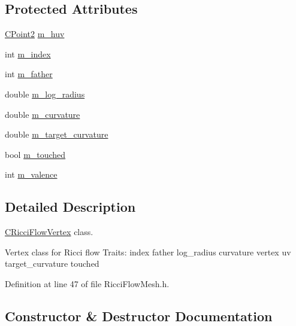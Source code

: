 \subsection*{Protected Attributes}
\begin{DoxyCompactItemize}
\item 
\hyperlink{class_mesh_lib_1_1_c_point2}{C\+Point2} \hyperlink{class_mesh_lib_1_1_c_ricci_flow_vertex_a674116f5178c06d98b5ef26deabdeec6}{m\+\_\+huv}
\item 
int \hyperlink{class_mesh_lib_1_1_c_ricci_flow_vertex_a7ab6932d891ddbb10c14f0ab984d3b36}{m\+\_\+index}
\item 
int \hyperlink{class_mesh_lib_1_1_c_ricci_flow_vertex_a6ed5050df5a2f6284a98bb37c553a57e}{m\+\_\+father}
\item 
double \hyperlink{class_mesh_lib_1_1_c_ricci_flow_vertex_ac9f92366ddb0d823a6dfc6a526db9295}{m\+\_\+log\+\_\+radius}
\item 
double \hyperlink{class_mesh_lib_1_1_c_ricci_flow_vertex_a4b6a000486252eb17ece2e2ba4bc60a8}{m\+\_\+curvature}
\item 
double \hyperlink{class_mesh_lib_1_1_c_ricci_flow_vertex_abdfb30ac08fc9aff4c7052bfb4986de3}{m\+\_\+target\+\_\+curvature}
\item 
bool \hyperlink{class_mesh_lib_1_1_c_ricci_flow_vertex_ac66ef1157c3442bb632cdf89d509370e}{m\+\_\+touched}
\item 
int \hyperlink{class_mesh_lib_1_1_c_ricci_flow_vertex_a5a1d0671376b738ad92c860eeb24eb09}{m\+\_\+valence}
\end{DoxyCompactItemize}


\subsection{Detailed Description}
\hyperlink{class_mesh_lib_1_1_c_ricci_flow_vertex}{C\+Ricci\+Flow\+Vertex} class. 

Vertex class for Ricci flow Traits\+: index father log\+\_\+radius curvature vertex uv target\+\_\+curvature touched 

Definition at line 47 of file Ricci\+Flow\+Mesh.\+h.



\subsection{Constructor \& Destructor Documentation}
